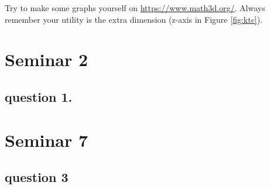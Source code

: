 \documentclass{article}
\begin{document}
\vspace{2mm}

Try to make some graphs yourself on \href{https://www.math3d.org/}{https://www.math3d.org/}. Always remember your utility is the 
extra dimension (z-axis in Figure \ref{fig:ktc}).



\section{Seminar 2}

\subsection{question 1.}

\section{Seminar 7}
\subsection{question 3}
\end{document}
